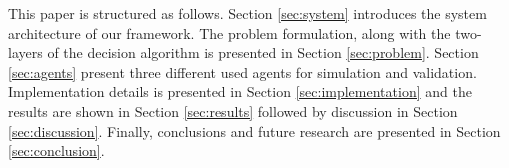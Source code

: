 
This paper is structured as follows. Section \ref{sec:system} introduces the system architecture of our framework. The problem formulation, along with the two-layers of the decision algorithm is presented in Section \ref{sec:problem}. Section \ref{sec:agents} present three different used agents for simulation and validation. Implementation details is presented in Section \ref{sec:implementation} and the results are shown in Section \ref{sec:results} followed by discussion in Section \ref{sec:discussion}. Finally, conclusions and future research are presented in Section \ref{sec:conclusion}.

\

